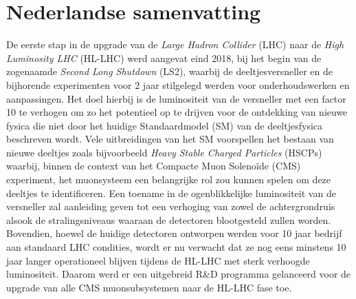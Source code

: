 \renewcommand\evenpagerightmark{{\scshape\small Nederlandse Samenvatting}}
\renewcommand\oddpageleftmark{{\scshape\small Dutch Summary}}

\hyphenation{}

\chapter[Nederlandse samenvatting]{Nederlandse samenvatting\\}
\label{samenvatting}

	De eerste stap in de upgrade van de {\it Large Hadron Collider} (LHC) naar de {\it High Luminosity LHC} (HL-LHC) werd aangevat eind 2018, bij het begin van de zogenaamde {\it Second Long Shutdown} (LS2), waarbij de deeltjesversneller en de bijhorende experimenten voor 2 jaar stilgelegd werden voor onderhoudswerken en aanpassingen. Het doel hierbij is de luminositeit van de versneller met een factor 10 te verhogen om zo het potentieel op te drijven voor de ontdekking van nieuwe fysica die niet door het huidige Standaardmodel (SM) van de deeltjesfysica beschreven wordt. Vele uitbreidingen van het SM voorspellen het bestaan van nieuwe deeltjes zoals bijvoorbeeld {\it Heavy Stable Charged Particles} (HSCPs) waarbij, binnen de context van het Compacte Muon Solenoïde (CMS) experiment, het muonsysteem een belangrijke rol zou kunnen spelen om deze deeltjes te identificeren. Een toename in de ogenblikkelijke luminositeit van de versneller zal aanleiding geven tot een verhoging van zowel de achtergrondruis alsook de stralingsniveaus waaraan de detectoren blootgesteld zullen worden. Bovendien, hoewel de huidige detectoren ontworpen werden voor 10 jaar bedrijf aan standaard LHC condities, wordt er nu verwacht dat ze nog eens minstens 10 jaar langer operationeel blijven tijdens de HL-LHC met sterk verhoogde luminositeit. Daarom werd er een uitgebreid R&D programma gelanceerd voor de upgrade van alle CMS muonsubsystemen naar de HL-LHC fase toe.\\ 
